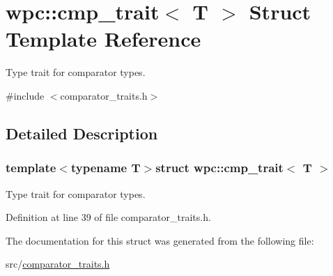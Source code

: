 \hypertarget{structwpc_1_1cmp__trait}{\section{wpc\-:\-:cmp\-\_\-trait$<$ T $>$ Struct Template Reference}
\label{structwpc_1_1cmp__trait}
}


Type trait for comparator types.  




{\ttfamily \#include $<$comparator\-\_\-traits.\-h$>$}



\subsection{Detailed Description}
\subsubsection*{template$<$typename T$>$struct wpc\-::cmp\-\_\-trait$<$ T $>$}

Type trait for comparator types. 

Definition at line 39 of file comparator\-\_\-traits.\-h.



The documentation for this struct was generated from the following file\-:\begin{DoxyCompactItemize}
\item 
src/\hyperlink{comparator__traits_8h}{comparator\-\_\-traits.\-h}\end{DoxyCompactItemize}

